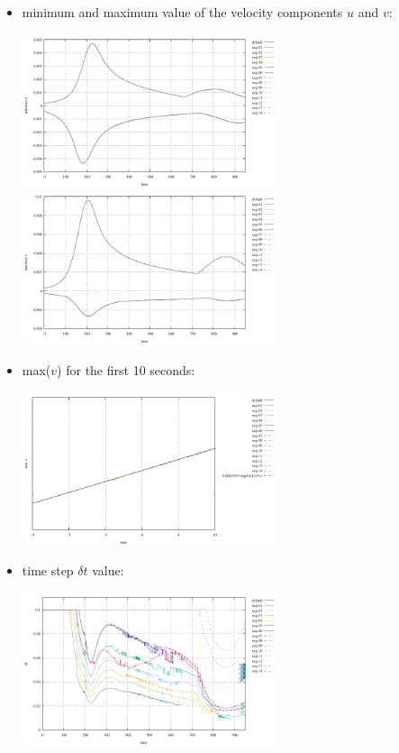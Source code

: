 \begin{itemize}
\item minimum and maximum value of the velocity components $u$ and $v$:

\begin{center}
\includegraphics[width=7.5cm]{python_codes/fieldstone_95/results/u}
\includegraphics[width=7.5cm]{python_codes/fieldstone_95/results/v}\\
\end{center}

\item max($v$) for the first 10 seconds:

\begin{center}
\includegraphics[width=7.5cm]{python_codes/fieldstone_95/results/v_start}
\end{center}

\item time step $\delta t$ value: 

\begin{center}
\includegraphics[width=7.5cm]{python_codes/fieldstone_95/results/dt}
\end{center}


\end{itemize}
